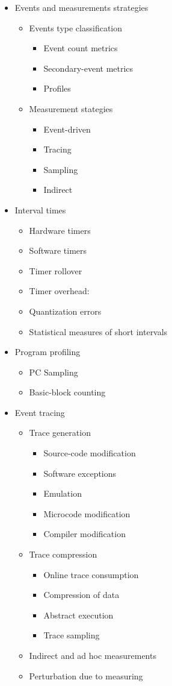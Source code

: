 \documentclass[openany, a4paper]{book}
\theoremstyle{plain}
\theoremstyle{definition}
\theoremstyle{remark}
\begin{document}
\begin{itemize}
\item Events and measurements strategies
\begin{itemize}
\item Events type classification
\begin{itemize}
\item Event count metrics
\item Secondary-event metrics
\item Profiles
\end{itemize}
\item Measurement stategies
\begin{itemize}
\item Event-driven
\item Tracing
\item Sampling
\item Indirect
\end{itemize}
\end{itemize}
\item Interval times
\begin{itemize}
\item Hardware timers
\item Software timers
\item Timer rollover
\item Timer overhead:
\item Quantization errors
\item Statistical measures of short intervals
\end{itemize}
\item Program profiling
\begin{itemize}
\item PC Sampling
\item Basic-block counting
\end{itemize}
\item Event tracing
\begin{itemize}
\item Trace generation
\begin{itemize}
\item Source-code modification
\item Software exceptions
\item Emulation
\item Microcode modification
\item Compiler modification
\end{itemize}
\item Trace compression
\begin{itemize}
\item Online trace consumption
\item Compression of data
\item Abstract execution
\item Trace sampling
\end{itemize}
\item Indirect and ad hoc measurements
\item Perturbation due to measuring
\end{itemize}
\end{itemize}
\end{document}
